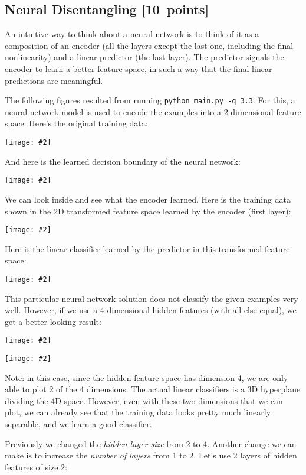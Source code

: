 \documentclass{article}
\newcommand\pts[1]{\textcolor{pointscolour}{[#1~points]}}
\newcommand{\centerfig}[2]{\begin{center}\texttt{[image: \#2]}\end{center}}
\begin{document}
\subsection{Neural Disentangling \pts{10}}

An intuitive way to think about a neural network is to think of it as a composition of an encoder (all the layers except the last one, including the final nonlinearity) and a linear predictor (the last layer). The predictor signals the encoder to learn a better feature space, in such a way that the final linear predictions are meaningful.

The following figures resulted from running \texttt{python main.py -q 3.3}. For this, a neural network model is used to encode the examples into a 2-dimensional feature space. Here's the original training data:

\centerfig{.7}{./figs/sinusoids.png}

And here is the learned decision boundary of the neural network:

\centerfig{.7}{./figs/sinusoids_decision_boundary_[2]_2.png}

We can look inside and see what the encoder learned. Here is the training data shown in the 2D transformed feature space learned by the encoder (first layer):

\centerfig{.7}{./figs/sinusoids_learned_features_[2]_2.png}

Here is the linear classifier learned by the predictor in this transformed feature space:

\centerfig{.7}{./figs/sinusoids_linear_boundary_[2]_2.png}


This particular neural network solution does not classify the given examples very well. However, if we use a 4-dimensional hidden features (with all else equal), we get a better-looking result:

\centerfig{.7}{./figs/sinusoids_decision_boundary_[4]_2.png}
\centerfig{.7}{./figs/sinusoids_linear_boundary_[4]_2.png}

Note: in this case, since the hidden feature space has dimension 4, we are only able to plot 2 of the 4 dimensions. The actual linear classifiers is a 3D hyperplane dividing the 4D space. However, even with these two dimensions that we can plot, we can already see that the training data looks pretty much linearly separable, and we learn a good classifier.

Previously we changed the \emph{hidden layer size} from 2 to 4. Another change we can make is to increase the \emph{number of layers} from 1 to 2. Let's use 2 layers of hidden features of size 2:
\end{document}

